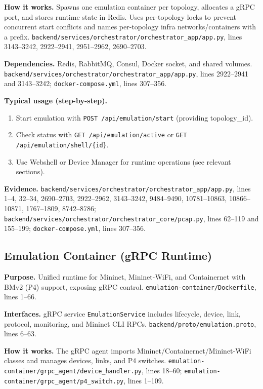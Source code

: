 \documentclass[conference]{IEEEtran}
\begin{document}
\textbf{How it works.} Spawns one emulation container per topology, allocates a gRPC port, and stores runtime state in Redis. Uses per-topology locks to prevent concurrent start conflicts and names per-topology infra networks/containers with a prefix. \texttt{backend/services/orchestrator/orchestrator\_app/app.py}, lines 3143--3242, 2922--2941, 2951--2962, 2690--2703.

\textbf{Dependencies.} Redis, RabbitMQ, Consul, Docker socket, and shared volumes. \texttt{backend/services/orchestrator/orchestrator\_app/app.py}, lines 2922--2941 and 3143--3242; \texttt{docker-compose.yml}, lines 307--356.

\textbf{Typical usage (step-by-step).}
\begin{enumerate}
\item Start emulation with \texttt{POST /api/emulation/start} (providing topology\_id).
\item Check status with \texttt{GET /api/emulation/active} or \texttt{GET /api/emulation/shell/\{id\}}.
\item Use Webshell or Device Manager for runtime operations (see relevant sections).
\end{enumerate}

\textbf{Evidence.} \texttt{backend/services/orchestrator/orchestrator\_app/app.py}, lines 1--4, 32--34, 2690--2703, 2922--2962, 3143--3242, 9484--9490, 10781--10863, 10866--10871, 1767--1809, 8742--8786; \texttt{backend/services/orchestrator/orchestrator\_core/pcap.py}, lines 62--119 and 155--199; \texttt{docker-compose.yml}, lines 307--356.

\subsection{Emulation Container (gRPC Runtime)}
\textbf{Purpose.} Unified runtime for Mininet, Mininet-WiFi, and Containernet with BMv2 (P4) support, exposing gRPC control. \texttt{emulation-container/Dockerfile}, lines 1--66.

\textbf{Interfaces.} gRPC service \texttt{EmulationService} includes lifecycle, device, link, protocol, monitoring, and Mininet CLI RPCs. \texttt{backend/proto/emulation.proto}, lines 6--63.

\textbf{How it works.} The gRPC agent imports Mininet/Containernet/Mininet-WiFi classes and manages devices, links, and P4 switches. \texttt{emulation-container/grpc\_agent/device\_handler.py}, lines 18--60; \texttt{emulation-container/grpc\_agent/p4\_switch.py}, lines 1--109.
\end{document}
